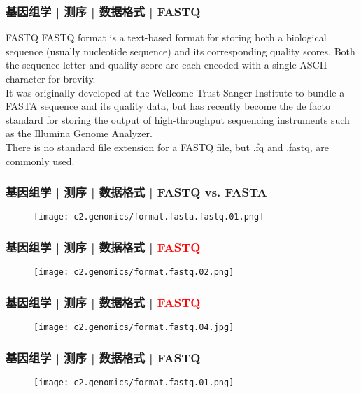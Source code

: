 \begin{frame}
  \frametitle{基因组学 | 测序 | 数据格式 | FASTQ}
  \begin{block}{FASTQ}
FASTQ format is a text-based format for storing both a biological sequence (usually nucleotide sequence) and its corresponding quality scores. Both the sequence letter and quality score are each encoded with a single ASCII character for brevity.\\
\vspace{1em}
It was originally developed at the Wellcome Trust Sanger Institute to bundle a FASTA sequence and its quality data, but has recently become the de facto standard for storing the output of high-throughput sequencing instruments such as the Illumina Genome Analyzer.\\
\vspace{1em}
There is no standard file extension for a FASTQ file, but .fq and .fastq, are commonly used.
  \end{block}
\end{frame}
    
\begin{frame}
  \frametitle{基因组学 | 测序 | 数据格式 | FASTQ vs. FASTA}
  \begin{figure}
    \centering
    \texttt{[image: c2.genomics/format.fasta.fastq.01.png]}
  \end{figure}
\end{frame}

\begin{frame}
  \frametitle{基因组学 | 测序 | 数据格式 | \textcolor{red}{FASTQ}}
  \begin{figure}
    \centering
    \texttt{[image: c2.genomics/format.fastq.02.png]}
  \end{figure}
\end{frame}
    
\begin{frame}
  \frametitle{基因组学 | 测序 | 数据格式 | \textcolor{red}{FASTQ}}
  \begin{figure}
    \centering
    \texttt{[image: c2.genomics/format.fastq.04.jpg]}
  \end{figure}
\end{frame}
    
\begin{frame}
  \frametitle{基因组学 | 测序 | 数据格式 | FASTQ}
  \begin{figure}
    \centering
    \texttt{[image: c2.genomics/format.fastq.01.png]}
  \end{figure}
\end{frame}
    
